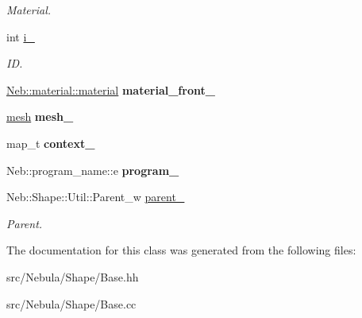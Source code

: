 \begin{DoxyCompactItemize}
\begin{DoxyCompactList}\small\item\em \-Material. \end{DoxyCompactList}\item 
\hypertarget{classNeb_1_1Shape_1_1Base_ac080174461c07d79ba809ae1291d3260}{int \hyperlink{classNeb_1_1Shape_1_1Base_ac080174461c07d79ba809ae1291d3260}{i\-\_\-}}\label{classNeb_1_1Shape_1_1Base_ac080174461c07d79ba809ae1291d3260}

\begin{DoxyCompactList}\small\item\em \-I\-D. \end{DoxyCompactList}\item 
\hypertarget{classNeb_1_1Shape_1_1Base_a35f56410d30b2a2e343032f3455e442b}{\hyperlink{classNeb_1_1material_1_1material}{\-Neb\-::material\-::material} {\bfseries material\-\_\-front\-\_\-}}\label{classNeb_1_1Shape_1_1Base_a35f56410d30b2a2e343032f3455e442b}

\item 
\hypertarget{classNeb_1_1Shape_1_1Base_a2086d7c205e5252154638253ae866773}{\hyperlink{classNeb_1_1mesh}{mesh} {\bfseries mesh\-\_\-}}\label{classNeb_1_1Shape_1_1Base_a2086d7c205e5252154638253ae866773}

\item 
\hypertarget{classNeb_1_1Shape_1_1Base_a1b211583183a5ade3976dae341fa474b}{map\-\_\-t {\bfseries context\-\_\-}}\label{classNeb_1_1Shape_1_1Base_a1b211583183a5ade3976dae341fa474b}

\item 
\hypertarget{classNeb_1_1Shape_1_1Base_a8e2e8da14ea737c5981da827615d54c8}{\-Neb\-::program\-\_\-name\-::e {\bfseries program\-\_\-}}\label{classNeb_1_1Shape_1_1Base_a8e2e8da14ea737c5981da827615d54c8}

\item 
\hypertarget{classNeb_1_1Shape_1_1Base_a905e6814c389cbeda30725da78fa4406}{\-Neb\-::\-Shape\-::\-Util\-::\-Parent\-\_\-w \hyperlink{classNeb_1_1Shape_1_1Base_a905e6814c389cbeda30725da78fa4406}{parent\-\_\-}}\label{classNeb_1_1Shape_1_1Base_a905e6814c389cbeda30725da78fa4406}

\begin{DoxyCompactList}\small\item\em \-Parent. \end{DoxyCompactList}\end{DoxyCompactItemize}


\-The documentation for this class was generated from the following files\-:\begin{DoxyCompactItemize}
\item 
src/\-Nebula/\-Shape/\-Base.\-hh\item 
src/\-Nebula/\-Shape/\-Base.\-cc\end{DoxyCompactItemize}
